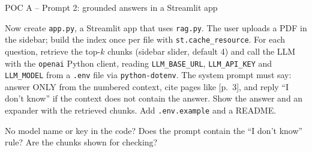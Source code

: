 \documentclass[aspectratio=169,11pt]{beamer}
\begin{document}
\begin{frame}{POC A -- Prompt 2: grounded answers in a Streamlit app}
  \begin{promptbox}
    \raggedright Now create \texttt{app.py}, a Streamlit app that uses \texttt{rag.py}. The user uploads a PDF in the sidebar; build the index once per file with \texttt{st.cache\_resource}. For each question, retrieve the top-$k$ chunks (sidebar slider, default 4) and call the LLM with the \texttt{openai} Python client, reading \texttt{LLM\_BASE\_URL}, \texttt{LLM\_API\_KEY} and \texttt{LLM\_MODEL} from a \texttt{.env} file via \texttt{python-dotenv}. The system prompt must say: answer ONLY from the numbered context, cite pages like [p.\ 3], and reply ``I don't know'' if the context does not contain the answer. Show the answer and an expander with the retrieved chunks. Add \texttt{.env.example} and a README.
  \end{promptbox}
  \vspace{4pt}
  \begin{infobox}
    \footnotesize No model name or key in the code? Does the prompt contain the ``I don't know'' rule? Are the chunks shown for checking?
  \end{infobox}
\end{frame}
\end{document}
